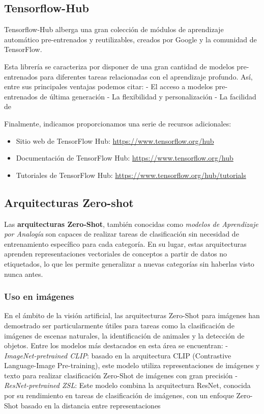 \documentclass[
  a4paper,
  DIV=11,
  numbers=noendperiod]{scrreprt}
\providecommand{\tightlist}{%
  \setlength{\itemsep}{0pt}\setlength{\parskip}{0pt}}\usepackage{longtable,booktabs,array}
\begin{document}
\subsection{Tensorflow-Hub}\label{tensorflow-hub}

Tensorflow-Hub alberga una gran colección de módulos de aprendizaje
automático pre-entrenados y reutilizables, creados por Google y la
comunidad de TensorFlow.

Esta librería se caracteriza por disponer de una gran cantidad de
modelos pre-entrenados para diferentes tareas relacionadas con el
aprendizaje profundo. Así, entre sus principales ventajas podemos citar:
- El acceso a modelos pre-entrenados de última generación - La
flexibilidad y personalización - La facilidad de

Finalmente, indicamos proporcionamos una serie de recursos adicionales:

\begin{itemize}
\tightlist
\item
  Sitio web de TensorFlow Hub: \url{https://www.tensorflow.org/hub}
\item
  Documentación de TensorFlow Hub: \url{https://www.tensorflow.org/hub}
\item
  Tutoriales de TensorFlow Hub:
  \url{https://www.tensorflow.org/hub/tutorials}
\end{itemize}

\subsection{Arquitecturas Zero-shot}\label{arquitecturas-zero-shot}

Las \textbf{arquitecturas Zero-Shot}, también conocidas como
\emph{modelos de Aprendizaje por Analogía} son capaces de realizar
tareas de clasificación sin necesidad de entrenamiento específico para
cada categoría. En su lugar, estas arquitecturas aprenden
representaciones vectoriales de conceptos a partir de datos no
etiquetados, lo que les permite generalizar a nuevas categorías sin
haberlas visto nunca antes.

\subsubsection{Uso en imágenes}\label{uso-en-imuxe1genes}

En el ámbito de la visión artificial, las arquitecturas Zero-Shot para
imágenes han demostrado ser particularmente útiles para tareas como la
clasificación de imágenes de escenas naturales, la identificación de
animales y la detección de objetos. Entre los modelos más destacados en
esta área se encuentran: - \emph{ImageNet-pretrained CLIP}: basado en la
arquitectura CLIP (Contrastive Language-Image Pre-training), este modelo
utiliza representaciones de imágenes y texto para realizar clasificación
Zero-Shot de imágenes con gran precisión - \emph{ResNet-pretrained ZSL}:
Este modelo combina la arquitectura ResNet, conocida por su rendimiento
en tareas de clasificación de imágenes, con un enfoque Zero-Shot basado
en la distancia entre representaciones
\end{document}
